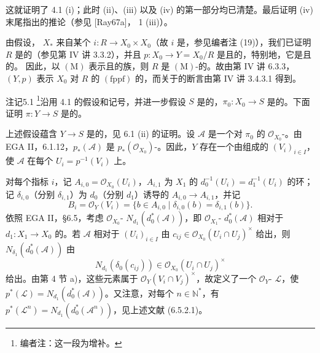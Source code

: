 这就证明了 4.1 (i)；此时 (ii)、(iii) 以及 (iv) 的第一部分均已清楚。最后证明 (iv) 末尾指出的推论（参见 [Ray67a]， 1 (iii)）。

由假设， $X_*$ 来自某个 $i:R\to X_0\times X_0$（故 $i$ 是，参见编者注 (19)），我们已证明 $R$ 是的（参见第 IV 讲 3.3.2），并且 $p:X_0\to Y=X_0/R$ 是且的，特别地，它是且的。
因此，以 $(\mathrm M)$ 表示且的族，则 $R$ 是 $(\mathrm M)$-的。故由第 IV 讲 6.3.3，$(Y,p)$ 表示 $X_0$ 对 $R$ 的 $(\mathrm{fppf})$ 的，而关于的断言由第 IV 讲 3.4.3.1 得到。

\begin{SGAresult}{注记}{5.1}
\footnote{编者注：这一段为增补。}沿用 4.1 的假设和记号，并进一步假设 $S$ 是的，$\pi_0:X_0\to S$ 是的。下面证明 $\pi:Y\to S$ 是的。
\end{SGAresult}
上述假设蕴含 $Y\to S$ 是的，见 6.1 (ii) 的证明。设 $\mathcal A$ 是一个对 $\pi_0$ 的 $\mathcal O_{X_0}$-。由 EGA II，6.1.12，$p_*(\mathcal A)$ 是 $p_*(\mathcal O_{X_0})$-。因此，$Y$ 存在一个由组成的 $(V_i)_{i\in I}$，使 $\mathcal A$ 在每个 $U_i=p^{-1}(V_i)$ 上。

对每个指标 $i$，记 $A_{i,0}=\mathcal O_{X_0}(U_i)$，$A_{i,1}$ 为 $X_1$ 的 $d_0^{-1}(U_i)=d_1^{-1}(U_i)$ 的环；记 $\delta_{i,0}$（分别 $\delta_{i,1}$）为 $d_0$（分别 $d_1$）诱导的 $A_{i,0}\to A_{i,1}$，并记
\[B_i=\mathcal O_Y(V_i)=\{b\in A_{i,0}\mid\delta_{i,0}(b)=\delta_{i,1}(b)\}.\]
依照 EGA II，§6.5，考虑 $\mathcal O_{X_0}$- $N_{d_1}(d_0^*(\mathcal A))$，即 $\mathcal O_{X_1}$- $d_0^*(\mathcal A)$ 相对于 $d_1:X_1\to X_0$ 的。若 $\mathcal A$ 相对于 $(U_i)_{i\in I}$ 由 $c_{ij}\in\mathcal O_{X_0}(U_i\cap U_j)^\times$ 给出，则 $N_{\delta_1}(d_0^*(\mathcal A))$ 由
\[N_{d_1}(\delta_0(c_{ij}))\in\mathcal O_{X_0}(U_i\cap U_j)^\times\]
给出。由第 4 节 a)，这些元素属于 $\mathcal O_Y(V_i\cap V_j)^\times$，故定义了一个 $\mathcal O_Y$- $\mathcal L$，使 $p^*(\mathcal L)=N_{d_1}(d_0^*(\mathcal A))$。又注意，对每个 $n\in\mathbb N^*$，有 $p^*(\mathcal L^n)=N_{d_1}(d_0^*(\mathcal A^n))$，见上述文献 (6.5.2.1)。

